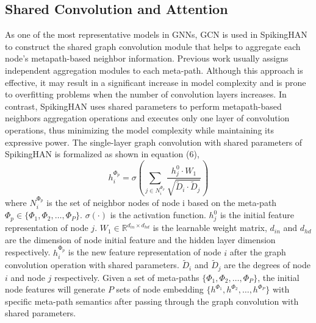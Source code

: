 \documentclass[letterpaper]{article} %
\begin{document}
\subsection{Shared Convolution and Attention}
As one of the most representative models in GNNs, GCN \cite{bib34} is used in SpikingHAN to construct the shared graph convolution module that helps to aggregate each node's metapath-based neighbor information. Previous work usually assigns independent aggregation modules to each meta-path. Although this approach is effective, it may result in a significant increase in model complexity and is prone to overfitting problems when the number of convolution layers increases. In contrast, SpikingHAN uses shared parameters to perform metapath-based neighbors aggregation operations and executes only one layer of convolution operations, thus minimizing the model complexity while maintaining its expressive power. The single-layer graph convolution with shared parameters of SpikingHAN is formalized as shown in equation (6), 
\begin{equation}
h_i^{\Phi_p}=\sigma\left(\sum_{j\in N_i^{\Phi_p}}\frac{h_j^0\cdot W_1}{\sqrt{\widetilde{D}_i\cdot\widetilde{D}_j}}\right)\label{eq6}
\end{equation}
where $N_i^{\mathrm{\Phi}_p}$ is the set of neighbor nodes of node i based on the meta-path $\Phi_p\in\{\Phi_1,\Phi_2,\ldots,\Phi_P\}$. $\sigma(\cdot)$ is the activation function. $h_j^0$ is the initial feature representation of node $j$. $W_1\in\mathbb{R}^{d_{in}\times d_{hd}}$ is the learnable weight matrix, $d_{in}$ and $d_{hd}$ are the dimension of node initial feature and the hidden layer dimension respectively. $h_i^{\mathrm{\Phi}_p}$ is the new feature representation of node $i$ after the graph convolution operation with shared parameters. ${\widetilde{D}}_i$ and ${\widetilde{D}}_j$ are the degrees of node $i$ and node $j$ respectively. Given a set of meta-paths $\{\Phi_1,\Phi_2,\ldots,\Phi_P\}$, the initial node features will generate $P$ sets of node embedding $\{h^{\Phi_1},h^{\Phi_2},\ldots,h^{\Phi_P}\}$ with specific meta-path semantics after passing through the graph convolution with shared parameters.
\end{document}
